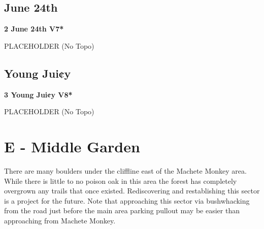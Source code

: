 \begin{multicols}{2}
\begin{adjustwidth}{0.5cm}{}
\end{adjustwidth}



\needspace{1.5cm}
\subsection*{June 24th}\label{bf:June 24th}
	


\needspace{1.5cm}
\label{rt:June 24th}
\colorbox{Goldenrod!50}{
\parbox{0.95\linewidth}{
\textbf{
2 June 24th V7*  
}}}
\begin{adjustwidth}{0.5cm}{}			
PLACEHOLDER
  (No Topo)
\end{adjustwidth}





\needspace{1.5cm}
\subsection*{Young Jui¢y}\label{bf:Young Jui¢y}
	


\needspace{1.5cm}
\label{rt:Young Jui¢y}
\colorbox{Goldenrod!50}{
\parbox{0.95\linewidth}{
\textbf{
3 Young Jui¢y V8*  
}}}
\begin{adjustwidth}{0.5cm}{}			
PLACEHOLDER
  (No Topo)
\end{adjustwidth}





\newpage

\section{E - Middle Garden}\label{sa:Middle Garden}
There are many boulders under the cliffline east of the Machete Monkey area. While there is little to no poison oak in this area the forest has completely overgrown any trails that once existed. Rediscovering and restablishing this sector is a project for the future. Note that approaching this sector via bushwhacking from the road just before the main area parking pullout may be easier than approaching from Machete Monkey.\\





\end{multicols}
\clearpage